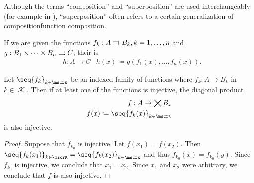\begin{definition}\label{def:superposition}
  Although the terms \enquote{composition} and \enquote{superposition} are used interchangeably (for example in \cite[]{Фихтенгольц1968Том1}), \enquote{superposition} often refers to a certain generalization of \hyperref[def:multi_valued_function]{composition}{function composition}.

  If we are given the functions \( f_k: A \rightrightarrows B_k, k = 1, \ldots, n \) and \( g: B_1 \times \cdots \times B_n \rightrightarrows C \), their  is
  \begin{equation*}
    \begin{aligned}
      &h: A \to C
      &h(x) \coloneqq g(f_1(x), \ldots, f_n(x)).
    \end{aligned}
  \end{equation*}
\end{definition}

\begin{lemma}\label{thm:diagonal_product_injectivity}
  Let \( \seq{ f_k }_{k \in \mscrK} \) be an indexed family of functions where \( f_k: A \to B_k \) in \( k \in \mscrK \). Then if at least one of the functions is injective, the \hyperref[def:topological_product]{diagonal product}
  \begin{equation*}
    \begin{aligned}
      f: A \to \bigtimes B_k \\
      f(x) \coloneqq \seq{ f_k(x) }_{k \in \mscrK}
    \end{aligned}
  \end{equation*}
  is also injective.
\end{lemma}
\begin{proof}
  Suppose that \( f_{k_0} \) is injective. Let \( f(x_1) = f(x_2) \). Then \( \seq{ f_k(x_1) }_{k \in \mscrK} = \seq{ f_k(x_2) }_{k \in \mscrK} \) and thus \( f_{k_0}(x) = f_{k_0}(y) \). Since \( f_{k_0} \) is injective, we conclude that \( x_1 = x_2 \). Since \( x_1 \) and \( x_2 \) were arbitrary, we conclude that \( f \) is also injective.
\end{proof}

